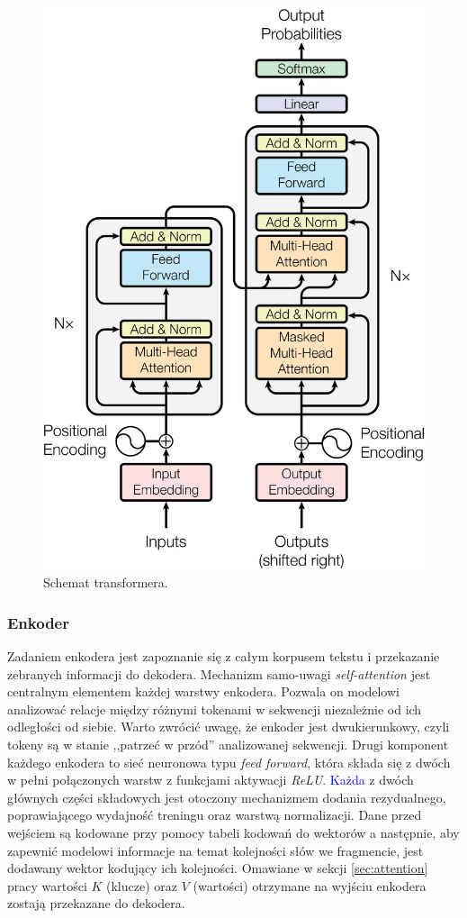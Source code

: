 \documentclass[data-science]{agh-wi} %
\begin{document}
\begin{figure}[!ht]
    \begin{center}
        \includegraphics[width=0.7\linewidth]{img/transformer1}
    \end{center}
    \caption{Schemat transformera.}
    \label{fig:transformer1}
\end{figure}

\subsubsection*{Enkoder}
Zadaniem enkodera jest zapoznanie się z całym korpusem tekstu i przekazanie zebranych informacji do dekodera. Mechanizm samo-uwagi \textit{self-attention} jest centralnym elementem każdej warstwy enkodera. Pozwala on modelowi analizować relacje między różnymi tokenami w sekwencji niezależnie od ich odległości od siebie. Warto zwrócić uwagę, że enkoder jest dwukierunkowy, czyli tokeny są w stanie ,,patrzeć w przód'' analizowanej sekwencji. Drugi komponent każdego enkodera to sieć neuronowa typu \textit{feed forward}, która składa się z dwóch w pełni połączonych warstw z funkcjami aktywacji \textit{ReLU}. \textcolor{blue}{Każda} z dwóch głównych części składowych jest otoczony mechanizmem dodania rezydualnego, poprawiającego wydajność treningu oraz warstwą normalizacji. Dane przed wejściem są kodowane przy pomocy tabeli kodowań do wektorów a następnie, aby zapewnić modelowi informacje na temat kolejności słów we fragmencie, jest dodawany wektor kodujący ich kolejności. Omawiane w sekcji \ref*{sec:attention} pracy wartości $K$ (klucze) oraz $V$ (wartości) otrzymane na wyjściu enkodera zostają przekazane do dekodera.
\end{document}

